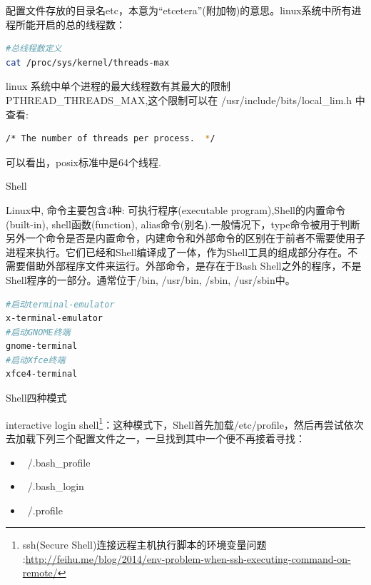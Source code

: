 \documentclass[12pt]{book}
\makeatletter
\numberwithin{dummy}{section}
\theoremstyle{ocrenumbox}
\theoremstyle{blacknumex}
\theoremstyle{blacknumbox}
\theoremstyle{ocrenum}
\renewcommand{\section}{\@startsection{section}{1}{\z@}
	{-4ex \@plus -1ex \@minus -.4ex}
	{1ex \@plus.2ex }
	{\normalfont\large\sffamily\bfseries}}
\renewcommand{\subsection}{\@startsection {subsection}{2}{\z@}
	{-3ex \@plus -0.1ex \@minus -.4ex}
	{0.5ex \@plus.2ex }
	{\normalfont\sffamily\bfseries}}
\makeatother
\begin{document}
配置文件存放的目录名etc，本意为“etcetera”(附加物)的意思。linux系统中所有进程所能开启的总的线程数：

\begin{lstlisting}[language=Bash]
#总线程数定义
cat /proc/sys/kernel/threads-max
\end{lstlisting}

linux 系统中单个进程的最大线程数有其最大的限制 PTHREAD\_THREADS\_MAX,这个限制可以在 /usr/include/bits/local\_lim.h 中查看:

\begin{lstlisting}[language=Bash]
/* The number of threads per process.  */
\end{lstlisting}

可以看出，posix标准中是64个线程.

\section{Shell}

Linux中, 命令主要包含4种: 可执行程序(executable program),Shell的内置命令(built-in), shell函数(function), alias命令(别名).一般情况下，type命令被用于判断另外一个命令是否是内置命令，内建命令和外部命令的区别在于前者不需要使用子进程来执行。它们已经和Shell编译成了一体，作为Shell工具的组成部分存在。不需要借助外部程序文件来运行。外部命令，是存在于Bash Shell之外的程序，不是Shell程序的一部分。通常位于/bin, /usr/bin, /sbin, /usr/sbin中。

\begin{lstlisting}[language=Bash]
#启动terminal-emulator
x-terminal-emulator
#启动GNOME终端
gnome-terminal
#启动Xfce终端
xfce4-terminal
\end{lstlisting}


\subsection{Shell四种模式}

interactive login shell\footnote{ssh(Secure Shell)连接远程主机执行脚本的环境变量问题
	:\url{http://feihu.me/blog/2014/env-problem-when-ssh-executing-command-on-remote/}}：这种模式下，Shell首先加载/etc/profile，然后再尝试依次去加载下列三个配置文件之一，一旦找到其中一个便不再接着寻找：

\begin{itemize}
	\item {~/.bash\_profile}
	\item{~/.bash\_login}
	\item{~/.profile}
\end{itemize}
\end{document}
